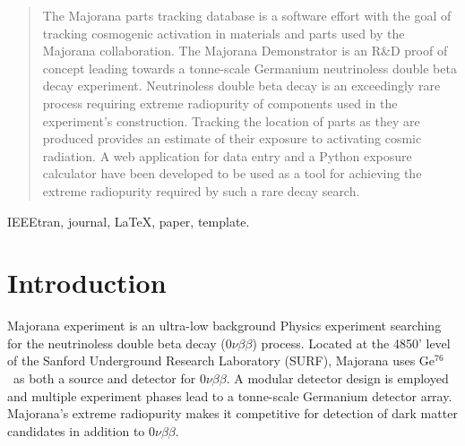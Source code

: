 \documentclass[journal]{IEEEtran}
\def\znbb{0$\nu\beta\beta$}
\def\enrGe{Ge$^{76}$}
\begin{document}




\maketitle

\begin{abstract}
The Majorana parts tracking database is a software effort with the goal of tracking
cosmogenic activation in materials and parts used by the Majorana collaboration. The
Majorana Demonstrator is an R\&D proof of concept leading towards a tonne-scale Germanium
neutrinoless double beta decay experiment. Neutrinoless double beta decay is an exceedingly
rare process requiring extreme radiopurity of components used in the experiment's
construction. Tracking the location of parts as they are produced provides an estimate
of their exposure to activating cosmic radiation. A web application for data entry
and a Python exposure calculator have been developed to be used as a tool for
achieving the extreme radiopurity required by such a rare decay search.
\end{abstract}

\begin{IEEEkeywords}
IEEEtran, journal, \LaTeX, paper, template.
\end{IEEEkeywords}






%
\IEEEpeerreviewmaketitle



\section{Introduction}
 Majorana experiment is an ultra-low background Physics
experiment searching for the neutrinoless double beta decay (\znbb) process.
Located at the 4850' level of the Sanford Underground Research Laboratory (SURF), 
Majorana uses \enrGe\ as both a source and detector for \znbb. A modular
detector design is employed and multiple experiment phases lead to a tonne-scale Germanium
detector array. Majorana's extreme radiopurity makes it competitive for
detection of dark matter candidates in addition to \znbb.
\end{document}
